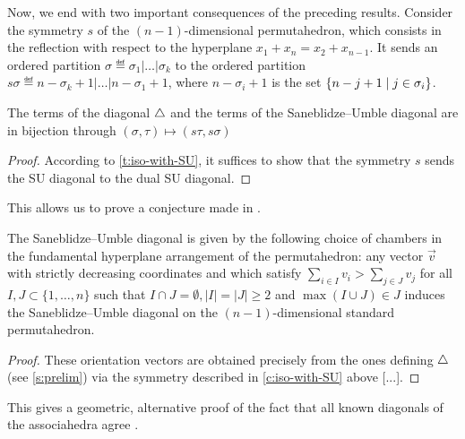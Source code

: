 Now, we end with two important consequences of the preceding results. 
Consider the symmetry $s$ of the $(n-1)$-dimensional permutahedron, which consists in the reflection with respect to the hyperplane $x_1 + x_n = x_2 + x_{n-1}$. 
It sends an ordered partition $\sigma \eqdef \sigma_1 | \ldots | \sigma_k$ to the ordered partition $s\sigma \eqdef n-\sigma_{k}+1 | \ldots | n-\sigma_{1}+1$, where $n-\sigma_i+1$ is the set $\left\{ n-j+1 \;\middle|\; j \in \sigma_i \right\}$. 
\begin{corollary}
\label{c:iso-with-SU}
The terms of the diagonal $\triangle$ and the terms of the Saneblidze--Umble diagonal are in bijection through $(\sigma,\tau) \mapsto (s\tau,s\sigma)$
\end{corollary}

\begin{proof}
According to \cref{t:iso-with-SU}, it suffices to show that the symmetry $s$ sends the SU diagonal to the dual SU diagonal. 
\end{proof}

This allows us to prove a conjecture made in \cite[Remark 3.19]{LA21}.

\begin{corollary} \label{SU from hyperplane arrangement}
    The Saneblidze--Umble diagonal is given by the following choice of chambers in the fundamental hyperplane arrangement of the permutahedron: any vector $\vec v$ with strictly decreasing coordinates and which satisfy $\sum_{i \in I} v_i > \sum_{j \in J} v_j$ for all $I,J \subset \{1, \ldots, n\}$ such that $I \cap J = \emptyset, |I|=|J| \geq 2$ and $\max(I \cup J) \in J$ induces the Saneblidze--Umble diagonal on the $(n-1)$-dimensional standard permutahedron. 
\end{corollary}

\begin{proof}
    These orientation vectors are obtained precisely from the ones defining $\triangle$ (see \cref{s:prelim}) via the symmetry described in \cref{c:iso-with-SU} above [...]. 
\end{proof}

This gives a geometric, alternative proof of the fact that all known diagonals of the associahedra agree \cite{saneblidzeComparingDiagonalsAssociahedra2022}.



